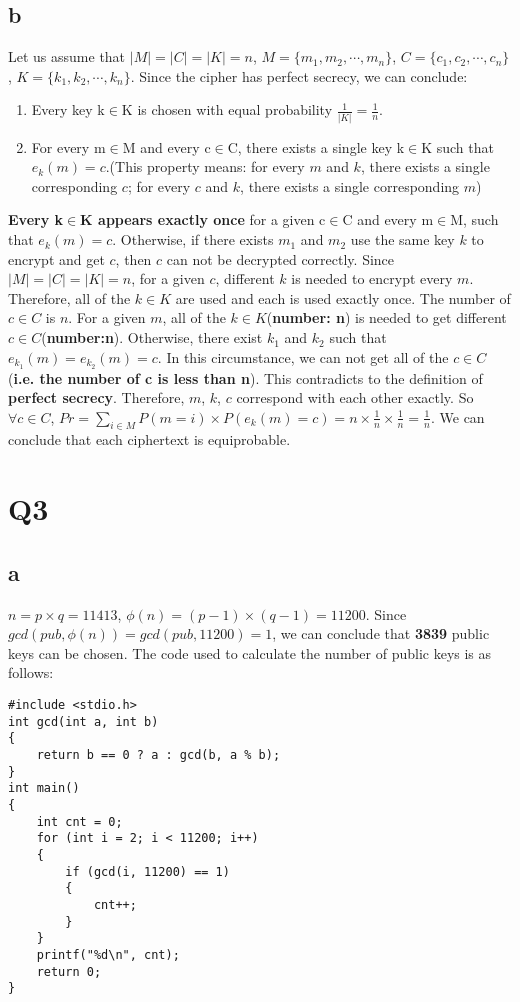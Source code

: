 \documentclass[12pt]{article}
\begin{document}
\subsection{b}
Let us assume that $|M|=|C|=|K|=n$, $M=\{m_1,m_2,\cdots,m_n\}$, $C=\{c_1,c_2,\cdots,c_n\}$, $K=\{k_1,k_2,\cdots,k_n\}$. Since the cipher has perfect secrecy, we can conclude:
\begin{enumerate}
    \item Every key k$\in$K is chosen with equal probability $\frac{1}{|K|}=\frac{1}{n}$.
    \item For every m$\in$M and every c$\in$C, there exists a single key k$\in$K such that $e_k(m)=c$.(This property means: for every $m$ and $k$, there exists a single corresponding $c$; for every $c$ and $k$, there exists a single corresponding $m$)
\end{enumerate}
\textbf{Every k$\in$K appears exactly once} for a given c$\in$C and every m$\in$M, such that $e_k(m)=c$. Otherwise, if there exists $m_1$ and $m_2$ use the same key $k$ to encrypt and get $c$, then $c$ can not be decrypted correctly. Since $|M|=|C|=|K|=n$, for a given $c$, different $k$ is needed to encrypt every $m$. Therefore, all of the $k\in K$ are used and each is used exactly once.
\newline
The number of $c\in C$ is $n$. For a given $m$, all of the $k\in K$(\textbf{number: n}) is needed to get different $c\in C$(\textbf{number:n}). Otherwise, there exist $k_1$ and $k_2$ such that $e_{k_1}(m)=e_{k_2}(m)=c$. In this circumstance, we can not get all of the $c\in C$(\textbf{i.e. the number of c is less than n}). This contradicts to the definition of \textbf{perfect secrecy}.
\newline
Therefore, $m$, $k$, $c$ correspond with each other exactly. So $\forall c\in C$, $Pr=\sum\limits_{i\in M}P(m=i)\times P(e_k(m)=c)=n\times \frac{1}{n}\times \frac{1}{n}=\frac{1}{n}$. We can conclude that each ciphertext is equiprobable.
\section{Q3}
\subsection{a}
$n=p\times q=11413$, $\phi(n)=(p-1)\times(q-1)=11200$. Since $gcd(pub, \phi(n))=gcd(pub, 11200)=1$, we can conclude that \textbf{3839} public keys can be chosen.
\newline
The code used to calculate the number of public keys is as follows:
\newline
\begin{lstlisting}
#include <stdio.h>
int gcd(int a, int b)
{
    return b == 0 ? a : gcd(b, a % b);
}
int main()
{
    int cnt = 0;
    for (int i = 2; i < 11200; i++)
    {
        if (gcd(i, 11200) == 1)
        {
            cnt++;
        }
    }
    printf("%d\n", cnt);
    return 0;
}
\end{lstlisting}
\end{document}
